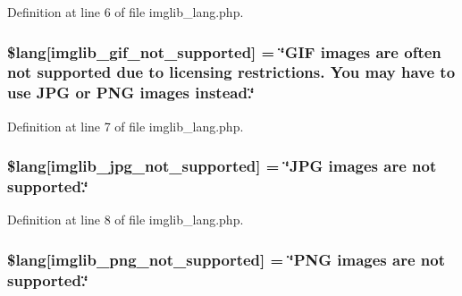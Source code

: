 Definition at line 6 of file imglib\+\_\+lang.\+php.

\subsubsection[{\texorpdfstring{\$lang}{$lang}}]{\setlength{\rightskip}{0pt plus 5cm}\$lang\mbox{[}\textquotesingle{}imglib\+\_\+gif\+\_\+not\+\_\+supported\textquotesingle{}\mbox{]} = \char`\"{}G\+IF images are often not supported due to licensing restrictions. You may have to use J\+PG or P\+NG images instead.\char`\"{}}\hypertarget{application_2language_2russian_2imglib__lang_8php_a235a59a6660145fc136b3933b5b10675}{}\label{application_2language_2russian_2imglib__lang_8php_a235a59a6660145fc136b3933b5b10675}


Definition at line 7 of file imglib\+\_\+lang.\+php.

\subsubsection[{\texorpdfstring{\$lang}{$lang}}]{\setlength{\rightskip}{0pt plus 5cm}\$lang\mbox{[}\textquotesingle{}imglib\+\_\+jpg\+\_\+not\+\_\+supported\textquotesingle{}\mbox{]} = \char`\"{}J\+PG images are not supported.\char`\"{}}\hypertarget{application_2language_2russian_2imglib__lang_8php_a4acdc927c172bab1370b2897c667c552}{}\label{application_2language_2russian_2imglib__lang_8php_a4acdc927c172bab1370b2897c667c552}


Definition at line 8 of file imglib\+\_\+lang.\+php.

\subsubsection[{\texorpdfstring{\$lang}{$lang}}]{\setlength{\rightskip}{0pt plus 5cm}\$lang\mbox{[}\textquotesingle{}imglib\+\_\+png\+\_\+not\+\_\+supported\textquotesingle{}\mbox{]} = \char`\"{}P\+NG images are not supported.\char`\"{}}\hypertarget{application_2language_2russian_2imglib__lang_8php_a0b7ea2e2fbd03eb72fe9d969adb643dd}{}\label{application_2language_2russian_2imglib__lang_8php_a0b7ea2e2fbd03eb72fe9d969adb643dd}


